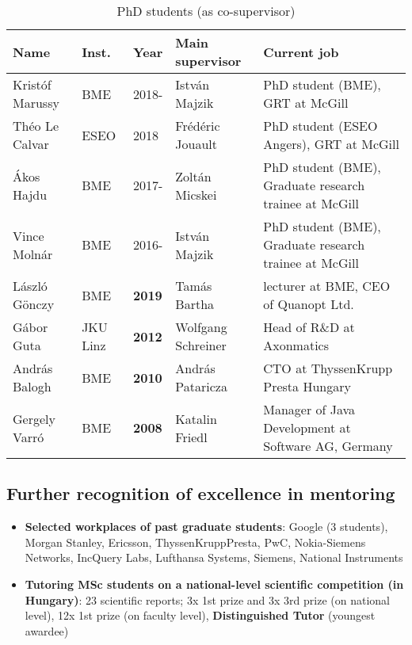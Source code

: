 \begin{table}[htb]
\footnotesize
\begin{tabular}{@{}llllp{8cm}@{}}
\toprule
\textbf{Name} & \textbf{Inst.} & \textbf{Year} & \textbf{Main supervisor} & \textbf{Current job} \\ \midrule
Krist\'of Marussy & BME & 2018-  & Istv\'an Majzik & PhD student (BME), GRT at McGill \\
Th\'eo Le Calvar & ESEO & 2018  & Fr\'ed\'eric Jouault & PhD student (ESEO Angers), GRT at McGill \\
\'Akos Hajdu & BME & 2017-  & Zolt\'an Micskei & PhD student (BME), Graduate research trainee at McGill \\
Vince Moln\'ar & BME & 2016-  & Istv\'an Majzik & PhD student (BME), Graduate research trainee at McGill \\ \midrule
L\'aszl\'o G\"onczy & BME & \textbf{2019}  & Tam\'as Bartha & lecturer at BME, CEO of Quanopt Ltd.\\
G\'abor Guta & JKU Linz & \textbf{2012}  & Wolfgang Schreiner & Head of R\&D at Axonmatics \\
Andr\'as Balogh & BME & \textbf{2010}  & Andr\'as Pataricza & CTO at ThyssenKrupp Presta Hungary \\
Gergely Varr\'o & BME & \textbf{2008}  & Katalin Friedl & Manager of Java Development at Software AG, Germany \\ \bottomrule
\end{tabular}
\caption{PhD students (as co-supervisor)}
\label{tab:phd-cosupervised}
\end{table}

\subsection{Further recognition of excellence in mentoring}

\begin{itemize}[leftmargin=0.5cm]
\item \textbf{Selected workplaces of past graduate students}: Google (3 students), Morgan Stanley, Ericsson, ThyssenKruppPresta, PwC, Nokia-Siemens Networks, 
IncQuery Labs, Lufthansa Systems, Siemens, National Instruments 

\item
\textbf{Tutoring MSc students on a national-level scientific competition (in Hungary)}: 
23 scientific reports; 3x 1st prize and 3x 3rd prize (on national
level), 12x 1st prize (on faculty level), %
\textbf{Distinguished Tutor}  (youngest awardee)
\end{itemize}


